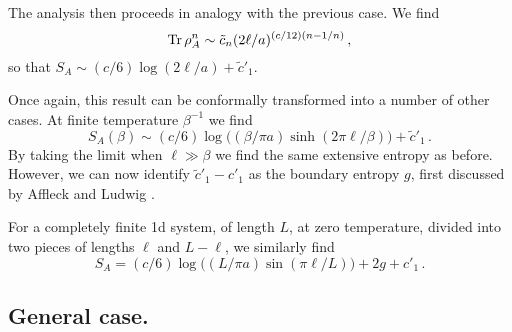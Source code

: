 \documentclass[12pt,aps,nofootinbib]{revtex4-1}
\begin{document}
The analysis then proceeds in analogy with the previous case. We find
\begin{equation}
{\rm Tr}\,\rho_{A}^n\sim \tilde c_n(2\ell/a)^{(c/12)(n-1/n)}\,,
\end{equation}
so that
$S_A\sim(c/6)\log(2\ell/a)+{\tilde c}'_1$.

Once again, this result can be conformally transformed into a number of
other cases. At finite temperature $\beta^{-1}$ we find
\begin{equation}
S_A(\beta)\sim(c/6)\log\big((\beta/\pi a)\sinh(2\pi\ell/\beta)\big)+
{\tilde c}'_1\,.
\end{equation}
By taking the limit when $\ell\gg\beta$ we find the same extensive
entropy as before. However, we can now identify ${\tilde c}'_1-c'_1$
as the boundary entropy $g$, first discussed by
Affleck and Ludwig \cite{AffleckLudwig}.

For a completely finite 1d system, of length $L$, at
zero temperature, divided into two pieces of lengths $\ell$ and
$L-\ell$, we similarly find
\begin{equation}
S_A=(c/6)\log\big((L/\pi a)\sin(\pi\ell/L)\big)+2g+c'_1\,.
\end{equation}

\subsection{General case.}
\end{document}
